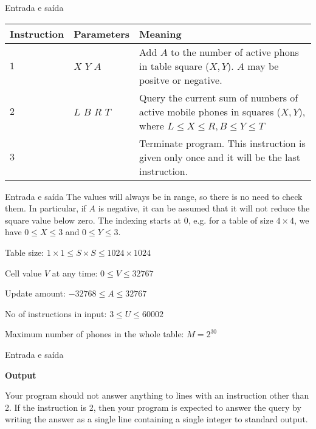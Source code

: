 \begin{frame}[fragile]{Entrada e saída}

\begin{tabularx}{0.95\textwidth}{llX}
    \toprule
    \textbf{Instruction} & \textbf{Parameters} & \textbf{Meaning} \\
    \midrule
    $1$ & $X$ $Y$ $A$ & Add $A$ to the number of active phons in table square ($X, Y$). $A$ may
        be positve or negative.\\
    \midrule
    $2$ & $L$ $B$ $R$ $T$ & Query the current sum of numbers of active mobile phones in squares
        ($X, Y$), where $L\leq X\leq R, B\leq Y\leq T$ \\
    \midrule
    $3$ & & Terminate program. This instruction is given only once and it will be the last
        instruction. \\
    \bottomrule
\end{tabularx}

\end{frame}

\begin{frame}[fragile]{Entrada e saída}
The values will always be in range, so there is no need to check them. In particular, if $A$ is 
negative, it can be assumed that it will not reduce the square value below zero. The indexing 
starts at 0, e.g. for a table of size $4 \times 4$, we have $0\leq X\leq 3$ and $0\leq Y\leq 3$. 

\vspace{0.2in}

Table size: $1 \times 1 \leq S \times S \leq 1024 \times 1024$

Cell value $V$ at any time: $0 \leq V \leq 32767$

Update amount: $-32768 \leq A \leq 32767$

No of instructions in input: $3 \leq U \leq 60002$

Maximum number of phones in the whole table: $M = 2^{30}$

\end{frame}


\begin{frame}[fragile]{Entrada e saída}

\textbf{Output}

Your program should not answer anything to lines with an instruction other than 2. If the instruction is 2, then your program is expected to answer the query by writing the answer as a single line containing a single integer to standard output.

\end{frame}


